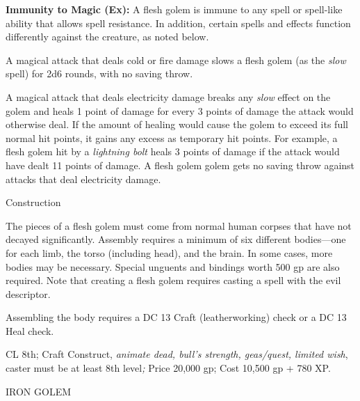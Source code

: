 \documentclass{article}
\begin{document}
\textbf{Immunity to Magic (Ex):} A flesh golem is immune to any spell or spell-like 
ability that allows spell resistance. In addition, certain spells and effects function 
differently against the creature, as noted below.

A magical attack that deals cold or fire damage slows a flesh golem (as the \textit{slow 
}spell) for 2d6 rounds, with no saving throw.

A magical attack that deals electricity damage breaks any \textit{slow }effect 
on the golem and heals 1 point of damage for every 3 points of damage the attack 
would otherwise deal. If the amount of healing would cause the golem to exceed 
its full normal hit points, it gains any excess as temporary hit points. For example, 
a flesh golem hit by a \textit{lightning bolt }heals 3 points of damage if the 
attack would have dealt 11 points of damage. A flesh golem golem gets no saving 
throw against attacks that deal electricity damage.

Construction

The pieces of a flesh golem must come from normal human corpses that have not decayed 
significantly. Assembly requires a minimum of six different bodies---one for each 
limb, the torso (including head), and the brain. In some cases, more bodies may 
be necessary. Special unguents and bindings worth 500 gp are also required. Note 
that creating a flesh golem requires casting a spell with the evil descriptor.

Assembling the body requires a DC 13 Craft (leatherworking) check or a DC 13 Heal 
check. 

CL 8th; Craft Construct, \textit{animate dead, bull's strength, geas/quest, limited 
wish}, caster must be at least 8th level\textit{; }Price 20,000 gp; Cost 10,500 
gp + 780 XP.

\vspace{12pt}
IRON GOLEM
\end{document}
